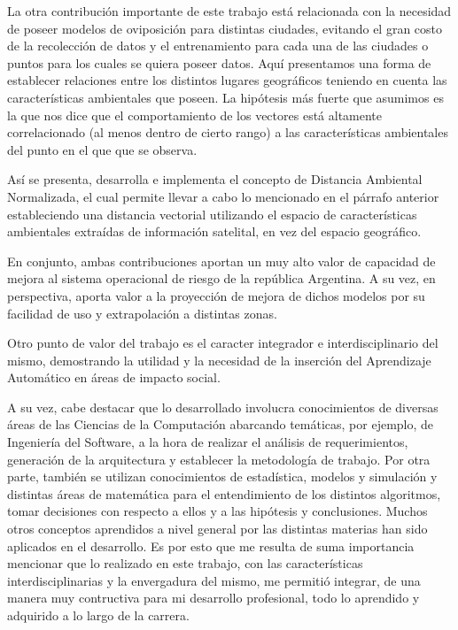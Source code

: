   \par La otra contribución importante de este trabajo está relacionada con la
    necesidad de poseer modelos de oviposición para distintas ciudades, evitando
    el gran costo de la recolección de datos y el entrenamiento para cada una de
    las ciudades o puntos para los cuales se quiera poseer datos. Aquí presentamos
    una forma de establecer relaciones entre los distintos lugares geográficos teniendo
    en cuenta las características ambientales que poseen. La hipótesis más fuerte que
    asumimos es la que nos dice que el comportamiento de los vectores está altamente
    correlacionado (al menos dentro de cierto rango) a las características ambientales
    del punto en el que que se observa.

  \par Así se presenta, desarrolla e implementa el concepto de Distancia Ambiental
    Normalizada, el cual permite
    llevar a cabo lo mencionado en el párrafo anterior estableciendo una distancia
    vectorial utilizando el espacio de características ambientales extraídas de
    información satelital, en vez del espacio geográfico.

  \par En conjunto, ambas contribuciones aportan un muy alto valor de capacidad de
    mejora al sistema operacional de riesgo de la república Argentina. A su vez,
    en perspectiva, aporta valor a la proyección de mejora de dichos modelos por
    su facilidad de uso y extrapolación a distintas zonas.

  \par Otro punto de valor del trabajo es el caracter integrador e
    interdisciplinario del mismo, demostrando la utilidad y la necesidad
    de la inserción del Aprendizaje Automático en áreas de impacto social.

  \par A su vez, cabe destacar que lo desarrollado involucra conocimientos de
    diversas áreas de las Ciencias de la Computación abarcando temáticas, por ejemplo, de
    Ingeniería del Software, a la hora de realizar el análisis de requerimientos,
    generación de la arquitectura y establecer la metodología de trabajo.
    Por otra parte, también se utilizan conocimientos de estadística, modelos y
    simulación y distintas áreas de matemática para el entendimiento de los
    distintos algoritmos, tomar decisiones con respecto a
    ellos y a las hipótesis y conclusiones. Muchos otros conceptos aprendidos
    a nivel general por las distintas materias han sido aplicados en el desarrollo.
    Es por esto que me resulta de suma importancia mencionar que lo realizado en
    este trabajo, con las características interdisciplinarias y la envergadura
    del mismo, me permitió integrar, de una manera muy contructiva para mi
    desarrollo profesional, todo lo aprendido y adquirido a lo largo de la carrera.

